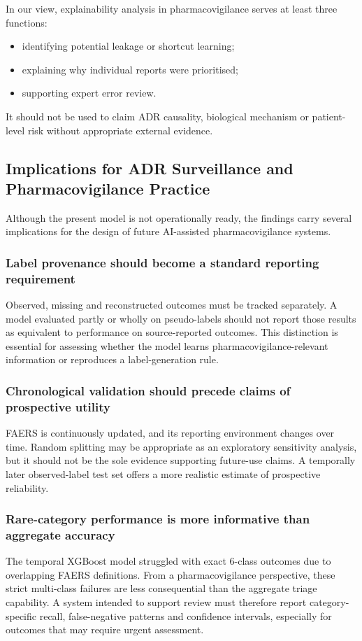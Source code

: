 \documentclass[10pt]{article}
\begin{document}
In our view, explainability analysis in pharmacovigilance serves at least three functions:
\begin{itemize}
\item identifying potential leakage or shortcut learning;
\item explaining why individual reports were prioritised;
\item supporting expert error review.
\end{itemize}
It should not be used to claim ADR causality, biological mechanism or patient-level risk without appropriate external evidence.

\subsection{Implications for ADR Surveillance and Pharmacovigilance Practice}
Although the present model is not operationally ready, the findings carry several implications for the design of future AI-assisted pharmacovigilance systems.

\subsubsection{Label provenance should become a standard reporting requirement}
Observed, missing and reconstructed outcomes must be tracked separately. A model evaluated partly or wholly on pseudo-labels should not report those results as equivalent to performance on source-reported outcomes. This distinction is essential for assessing whether the model learns pharmacovigilance-relevant information or reproduces a label-generation rule.

\subsubsection{Chronological validation should precede claims of prospective utility}
FAERS is continuously updated, and its reporting environment changes over time. Random splitting may be appropriate as an exploratory sensitivity analysis, but it should not be the sole evidence supporting future-use claims. A temporally later observed-label test set offers a more realistic estimate of prospective reliability.

\subsubsection{Rare-category performance is more informative than aggregate accuracy}
The temporal XGBoost model struggled with exact 6-class outcomes due to overlapping FAERS definitions. From a pharmacovigilance perspective, these strict multi-class failures are less consequential than the aggregate triage capability. A system intended to support review must therefore report category-specific recall, false-negative patterns and confidence intervals, especially for outcomes that may require urgent assessment.
\end{document}
